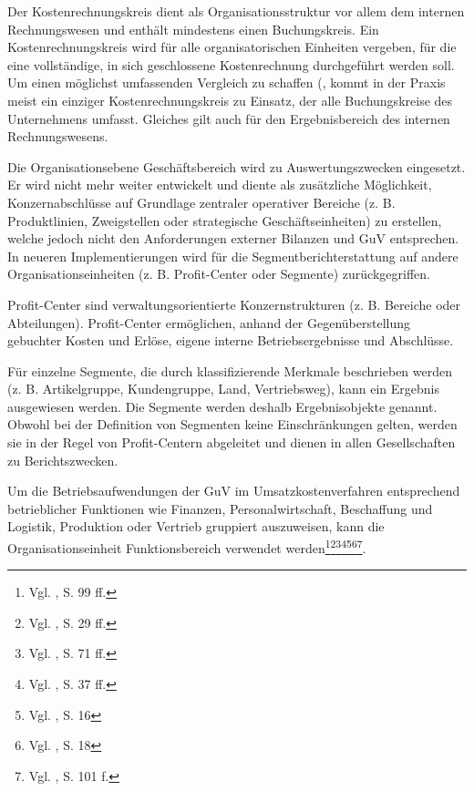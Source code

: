 Der Kostenrechnungskreis dient als Organisationsstruktur vor allem dem internen Rechnungswesen und enthält mindestens einen Buchungskreis. Ein Kostenrechnungskreis wird für alle organisatorischen Einheiten vergeben, für die eine vollständige, in sich geschlossene Kostenrechnung durchgeführt werden soll. Um einen möglichst umfassenden Vergleich zu schaffen (, kommt in der Praxis meist ein einziger Kostenrechnungskreis zu Einsatz, der alle Buchungskreise des Unternehmens umfasst. Gleiches gilt auch für den Ergebnisbereich des internen Rechnungswesens.

Die Organisationsebene Geschäftsbereich wird zu Auswertungszwecken eingesetzt. Er wird nicht mehr weiter entwickelt und diente als zusätzliche Möglichkeit, Konzernabschlüsse auf Grundlage zentraler operativer Bereiche (z. B. Produktlinien, Zweigstellen oder strategische Geschäftseinheiten) zu erstellen, welche jedoch nicht den Anforderungen externer Bilanzen und GuV entsprechen. In neueren Implementierungen wird für die Segmentberichterstattung auf andere Organisationseinheiten (z. B. Profit-Center oder Segmente) zurückgegriffen.

Profit-Center sind verwaltungsorientierte Konzernstrukturen (z. B. Bereiche oder Abteilungen). Profit-Center ermöglichen, anhand der Gegenüberstellung gebuchter Kosten und Erlöse, eigene interne Betriebsergebnisse und Abschlüsse.

Für einzelne Segmente, die durch klassifizierende Merkmale beschrieben werden (z. B. Artikelgruppe, Kundengruppe, Land, Vertriebsweg), kann ein Ergebnis ausgewiesen werden. Die Segmente werden deshalb Ergebnisobjekte genannt. Obwohl bei der Definition von Segmenten keine Einschränkungen gelten, werden sie in der Regel von Profit-Centern abgeleitet und dienen in allen Gesellschaften zu Berichtszwecken. 

Um die Betriebsaufwendungen der GuV im Umsatzkostenverfahren entsprechend betrieblicher Funktionen wie Finanzen, Personalwirtschaft, Beschaffung und Logistik, Produktion oder Vertrieb gruppiert auszuweisen, kann die Organisationseinheit Funktionsbereich verwendet werden\footnote{Vgl. \cite{Hefner2001}, S. 99 ff.}\footnote{Vgl. \cite{Friedl2008}, S. 29 ff.}\footnote{Vgl. \cite{Maassen2006}, S. 71 ff.}\footnote{Vgl. \cite{Patel2009}, S. 37 ff.}\footnote{Vgl. \cite{Padhi2011}, S. 16}\footnote{Vgl. \cite{SAPFI2001}, S. 18}\footnote{Vgl. \cite{Jandt2008}, S. 101 f.}.

